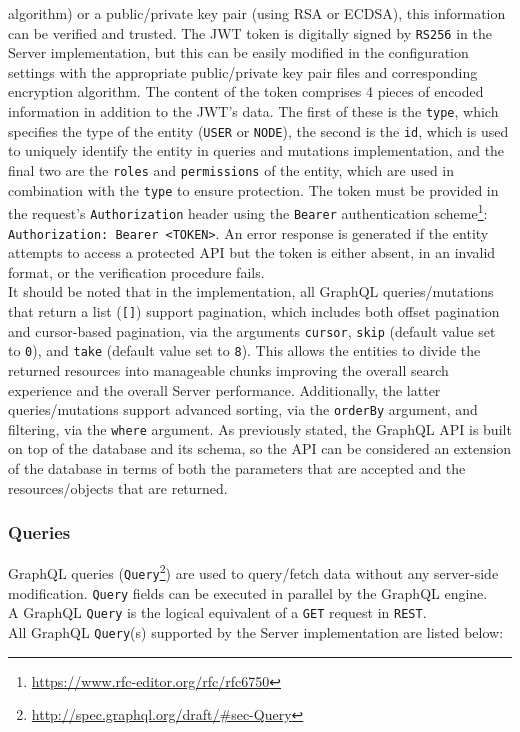 algorithm) or a public/private key pair (using RSA or ECDSA), this information
can be verified and trusted\cite{rfc_7519}. The JWT token is digitally signed by
\texttt{RS256} in the Server implementation, but this can be easily modified in
the configuration settings with the appropriate public/private key pair files
and corresponding encryption algorithm. The content of the token comprises 4 pieces
of encoded information in addition to the JWT's data. The first of these is the
\texttt{type}, which specifies the type of the entity (\texttt{USER} or \texttt{NODE}),
the second is the \texttt{id}, which is used to uniquely identify the entity in queries
and mutations implementation, and the final two are the \texttt{roles} and \texttt{permissions}
of the entity, which are used in combination with the \texttt{type} to ensure
protection. The token must be provided in the request's \texttt{Authorization}
header using the \texttt{Bearer} authentication scheme\footnote{\url{https://www.rfc-editor.org/rfc/rfc6750}}:
\texttt{Authorization: Bearer <TOKEN>}. An error response is generated if the entity
attempts to access a protected API but the token is either absent, in an invalid
format, or the verification procedure fails. \\ %
It should be noted that in the implementation, all GraphQL queries/mutations
that return a list (\texttt{[]}) support pagination, which includes both offset pagination
and cursor-based pagination, via the arguments \texttt{cursor}, \texttt{skip} (default
value set to \texttt{0}), and \texttt{take} (default value set to \texttt{8}).
This allows the entities to divide the returned resources into manageable chunks
improving the overall search experience and the overall Server performance. Additionally,
the latter queries/mutations support advanced sorting, via the \texttt{orderBy}
argument, and filtering, via the \texttt{where} argument. As previously stated, the
GraphQL API is built on top of the database and its schema, so the API can be
considered an extension of the database in terms of both the parameters that are
accepted and the resources/objects that are returned.

\subsubsection{Queries}
\label{subsubsec:implementation_server_graphql_api_queries}

GraphQL queries (\texttt{Query}\footnote{\url{http://spec.graphql.org/draft/\#sec-Query}})
are used to query/fetch data without any server-side modification. \texttt{Query}
fields can be executed in parallel by the GraphQL engine. \\ %
A GraphQL \texttt{Query} is the logical equivalent of a \texttt{GET} request in
\texttt{REST}. \\ %
All GraphQL \texttt{Query}(s) supported by the Server implementation are listed below:

